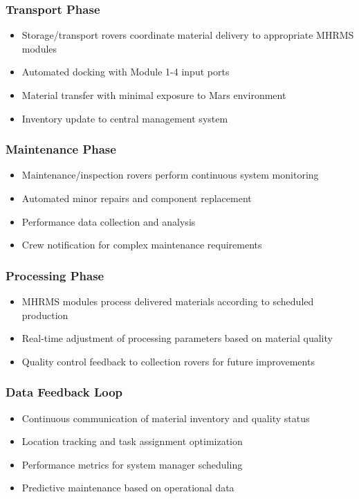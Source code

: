 \documentclass[12pt, a4paper]{article}
\begin{document}
\subsubsection{Transport Phase}
\begin{itemize}
    \item Storage/transport rovers coordinate material delivery to appropriate MHRMS modules
    \item Automated docking with Module 1-4 input ports
    \item Material transfer with minimal exposure to Mars environment
    \item Inventory update to central management system
\end{itemize}

\subsubsection{Maintenance Phase}
\begin{itemize}
    \item Maintenance/inspection rovers perform continuous system monitoring
    \item Automated minor repairs and component replacement
    \item Performance data collection and analysis
    \item Crew notification for complex maintenance requirements
\end{itemize}

\subsubsection{Processing Phase}
\begin{itemize}
    \item MHRMS modules process delivered materials according to scheduled production
    \item Real-time adjustment of processing parameters based on material quality
    \item Quality control feedback to collection rovers for future improvements
\end{itemize}

\subsubsection{Data Feedback Loop}
\begin{itemize}
    \item Continuous communication of material inventory and quality status
    \item Location tracking and task assignment optimization
    \item Performance metrics for system manager scheduling
    \item Predictive maintenance based on operational data
\end{itemize}
\end{document}
